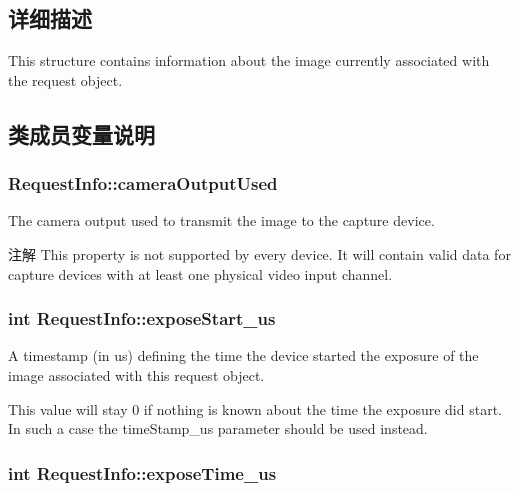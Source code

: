 \subsection{详细描述}
This structure contains information about the image currently associated with the request object. 

\subsection{类成员变量说明}
\hypertarget{struct_request_info_aa31d1557a0a099f3707a318acad4e3be}{
\subsubsection[{camera\+Output\+Used}]{ Request\+Info\+::camera\+Output\+Used}}\label{struct_request_info_aa31d1557a0a099f3707a318acad4e3be}


The camera output used to transmit the image to the capture device. 

\begin{DoxyNote}{注解}
This property is not supported by every device. It will contain valid data for capture devices with at least one physical video input channel. 
\end{DoxyNote}
\hypertarget{struct_request_info_a448cb9b558f66a42a3f3231379d5750d}{
\subsubsection[{expose\+Start\+\_\+us}]{\setlength{\rightskip}{0pt plus 5cm}int Request\+Info\+::expose\+Start\+\_\+us}}\label{struct_request_info_a448cb9b558f66a42a3f3231379d5750d}


A timestamp (in us) defining the time the device started the exposure of the image associated with this request object. 

This value will stay 0 if nothing is known about the time the exposure did start. In such a case the time\+Stamp\+\_\+us parameter should be used instead. \hypertarget{struct_request_info_a7e79697a4d66237fce3ce7fd077b92e1}{
\subsubsection[{expose\+Time\+\_\+us}]{\setlength{\rightskip}{0pt plus 5cm}int Request\+Info\+::expose\+Time\+\_\+us}}\label{struct_request_info_a7e79697a4d66237fce3ce7fd077b92e1}


